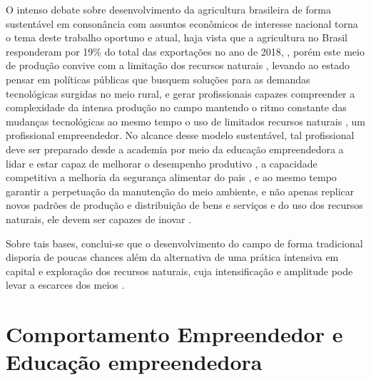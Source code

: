 O intenso debate sobre desenvolvimento da agricultura brasileira de forma sustentável em consonância com assuntos econômicos de interesse nacional torna o tema deste trabalho oportuno e atual, haja vista que a agricultura no Brasil responderam por 19\% do total das exportações no ano de 2018, \cite{mdic_comex_2019}, porém este meio de produção convive com a  limitação dos recursos naturais \cite{jacobi_meio_1999}, levando ao estado pensar em políticas públicas que busquem soluções para as demandas tecnológicas surgidas no meio rural, e gerar profissionais capazes compreender a complexidade da intensa produção no campo mantendo o ritmo constante das mudanças tecnológicas ao mesmo tempo o uso de limitados recursos naturais  \cite{costa_dinamica_2016}, um profissional empreendedor.
No alcance desse modelo sustentável, tal profissional deve ser preparado desde a academia por meio da educação empreendedora a lidar e estar capaz de melhorar o desempenho produtivo \cite{da_silva_qualidade_2017}, a capacidade competitiva a melhoria da segurança alimentar do pais \cite{hoffmann_brasil_2014}, e ao mesmo tempo garantir a perpetuação da manutenção do meio ambiente, e não apenas replicar novos padrões de produção e distribuição de bens e serviços e do uso dos recursos naturais, ele devem ser capazes de inovar \cite{morais_empreendedorismo_2018}.

Sobre tais bases, conclui-se que o desenvolvimento do campo de forma tradicional disporia de poucas chances além da alternativa de uma prática intensiva em capital e exploração dos recursos naturais, cuja intensificação e amplitude pode levar a escarces dos meios \cite{costa_agrarian_2016}. 


\section{Comportamento Empreendedor e Educação empreendedora}

